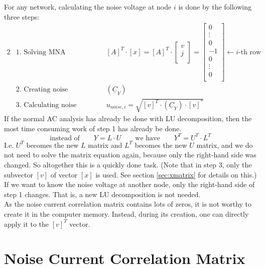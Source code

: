 For any network, calculating the noise voltage at node $i$
is done by the following three steps:
\begin{alignat}{2}
 & \text{1. Solving MNA equation:} & \qquad & \left[A\right]^T \cdot \left[x\right] =
\left[A\right]^T \cdot
\begin{bmatrix}
v \\
j \\
\end{bmatrix}
=
\begin{bmatrix}
0 \\
\vdots \\
0 \\
-1 \\
0 \\
\vdots \\
0 \\
\end{bmatrix}
\leftarrow i\text{-th row} \\
 & \text{2. Creating noise correlation matrix:} & \qquad
 & \left( \underline{C}_Y \right) \\
 & \text{3. Calculating noise voltage:} & \qquad
 & u_{noise,i} = \sqrt{\left[v\right]^T \cdot \left( \underline{C}_Y \right) \cdot \left[v\right]^*}
\end{alignat}
If the normal AC analysis has already be done with LU decomposition,
then the most time consuming work of step 1 has already be done.
\begin{equation}
\text{instead of} \qquad Y = L\cdot U \qquad \text{we have} \qquad
Y^T = U^T \cdot L^T
\end{equation}
I.e. $U^T$ becomes the new $L$ matrix and $L^T$ becomes the new $U$
matrix, and we do not need to solve the matrix equation again,
because only the right-hand side was changed. So altogether this
is a quickly done task. (Note that in step 3, only the subvector
$[v]$ of vector $[x]$ is used. See section \ref{sec:xmatrix} for
details on this.)\\
If we want to know the noise voltage at another node, only the
right-hand side of step 1 changes. That is, a new LU decomposition
is not needed.\\
As the noise current correlation matrix contains lots of zeros, it
is not worthy to create it in the computer memory. Instead, during
its creation, one can directly apply it to the $\left[v\right]^T$
vector.


\section{Noise Current Correlation Matrix}

